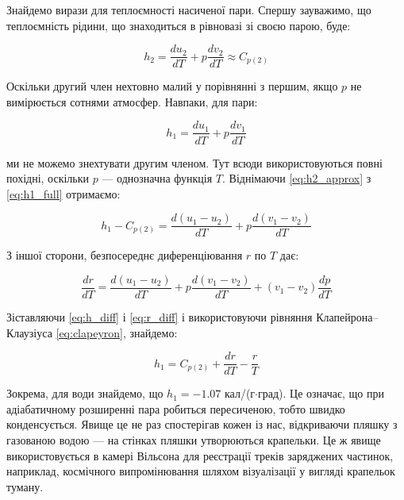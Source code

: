 Знайдемо вирази для теплоємності насиченої пари. Спершу зауважимо, що теплоємність рідини, що
знаходиться в рівновазі зі своєю парою, буде:

\begin{equation}\label{eq:h2_approx}
h_{2} = \frac{du_{2}}{dT} + p\frac{dv_{2}}{dT} \approx C_{p(2)}
\end{equation}

Оскільки другий член нехтовно малий у порівнянні з першим, якщо $p$ не вимірюється сотнями атмосфер.
Навпаки, для пари:

\begin{equation}\label{eq:h1_full}
h_{1} = \frac{du_{1}}{dT} + p\frac{dv_{1}}{dT}
\end{equation}

ми не можемо знехтувати другим членом. Тут всюди використовуються повні похідні, оскільки $p$ ---
однозначна функція $T$. Віднімаючи \eqref{eq:h2_approx} з \eqref{eq:h1_full} отримаємо:

\begin{equation}\label{eq:h_diff}
h_{1} - C_{p(2)} = \frac{d(u_{1} - u_{2})}{dT} + p\frac{d(v_{1} - v_{2})}{dT}
\end{equation}

З іншої сторони, безпосереднє диференціювання $r$ по $T$ дає:

\begin{equation}\label{eq:r_diff}
\frac{dr}{dT} = \frac{d(u_{1} - u_{2})}{dT} + p\frac{d(v_{1} - v_{2})}{dT} + (v_{1} -
v_{2})\frac{dp}{dT}
\end{equation}

Зіставляючи \eqref{eq:h_diff} і \eqref{eq:r_diff} і використовуючи рівняння Клапейрона--Клаузіуса
\eqref{eq:clapeyron}, знайдемо:

\begin{equation}\label{eq:h1_final}
h_{1} = C_{p(2)} + \frac{dr}{dT} - \frac{r}{T}
\end{equation}

Зокрема, для води знайдемо, що $h_{1} = -1.07$ кал/(г$\cdot$град). Це означає, що при адіабатичному
розширенні пара робиться пересиченою, тобто швидко конденсується. Явище це не раз спостерігав кожен із
нас, відкриваючи пляшку з газованою водою --- на стінках пляшки утворюються крапельки. Це ж явище
використовується в камері Вільсона для реєстрації треків заряджених частинок, наприклад, космічного
випромінювання шляхом візуалізації у вигляді крапельок туману.

